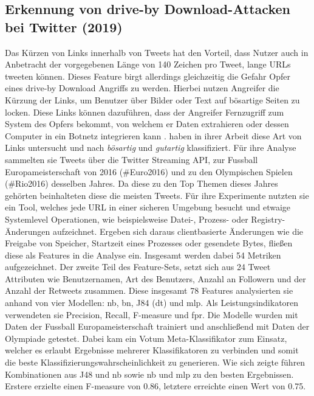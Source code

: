 \documentclass[
    12pt, %
    DIV10,
    ngerman, %
    a4paper, %
    oneside, %
    titlepage, %
    parskip=half, %
    headings=normal, %
    listof=totoc, %
    bibliography=totoc, %
    index=totoc, %
    captions=tableheading, %
    final %
]{scrreprt}
\begin{document}
\subsection{Erkennung von drive-by Download-Attacken bei Twitter (2019)}
Das Kürzen von Links innerhalb von Tweets hat den Vorteil, dass Nutzer auch in Anbetracht der vorgegebenen Länge von 140 Zeichen pro Tweet, lange URLs tweeten können. Dieses Feature birgt allerdings gleichzeitig die Gefahr Opfer eines drive-by Download Angriffs zu werden. Hierbei nutzen Angreifer die Kürzung der Links, um Benutzer über Bilder oder Text auf bösartige Seiten zu locken.
Diese Links können dazuführen, dass der Angreifer Fernzugriff zum System des Opfers bekommt, von welchem er Daten extrahieren oder dessen Computer in ein Botnetz integrieren kann \parencite{provos2007ghost}.
\textcite{Javed2019} haben in ihrer Arbeit diese Art von Links untersucht und nach \emph{bösartig} und \emph{gutartig} klassifiziert. Für ihre Analyse sammelten sie Tweets über die Twitter Streaming API, zur Fussball Europameisterschaft von 2016 (\#Euro2016) und zu den Olympischen Spielen (\#Rio2016) desselben Jahres. Da diese zu den Top Themen dieses Jahres gehörten beinhalteten diese die meisten Tweets. Für ihre Experimente nutzten sie ein Tool, welches jede URL in einer sicheren Umgebung besucht und etwaige Systemlevel Operationen, wie beispielsweise Datei-, Prozess- oder Registry-Änderungen aufzeichnet. Ergeben sich daraus clientbasierte Änderungen wie die Freigabe von Speicher, Startzeit eines Prozesses oder gesendete Bytes, fließen diese als Features in die Analyse ein. Insgesamt werden dabei 54 Metriken aufgezeichnet. Der zweite Teil des Feature-Sets, setzt sich aus 24 Tweet Attributen wie Benutzernamen, Art des Benutzers, Anzahl an Followern und der Anzahl der Retweets zusammen. Diese insgesamt 78 Features analysierten sie anhand von vier Modellen: \acl{nb}, \acl{bn}, J84 (\acl{dt}) und \ac{mlp}. Als Leistungsindikatoren verwendeten sie Precision, Recall, F-measure und \ac{fpr}. Die Modelle wurden mit Daten der Fussball Europameisterschaft trainiert und anschließend mit Daten der Olympiade getestet. Dabei kam ein Votum Meta-Klassifikator zum  Einsatz, welcher es erlaubt Ergebnisse mehrerer Klassifikatoren zu verbinden und somit die beste Klassifizierungswahrscheinlichkeit zu generieren. Wie sich zeigte führen Kombinationen aus J48 und \ac{nb} sowie \ac{nb} und \ac{mlp} zu den besten Ergebnissen. Erstere erzielte einen F-measure von 0.86, letztere erreichte einen Wert von 0.75.
\\\\
\end{document}

